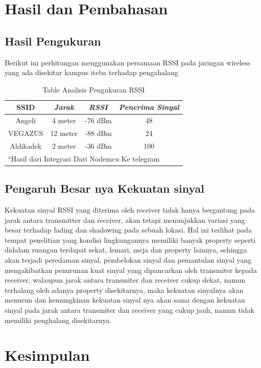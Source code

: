 \documentclass[conference]{IEEEtran}
\begin{document}
\section{Hasil dan Pembahasan}
\subsection{Hasil Pengukuran}
Berikut ini perhitungan menggunakan persamaan RSSI 
pada jaringan wireless yang ada disekitar 
kampus iteba terhadap pengahalang



\begin{table}[htbp]
    \caption{Table Analisis Pengukuran RSSI}
    \begin{center}
    \begin{tabular}{|c|c|c|c|}
        \hline
    \textbf{SSID} & \textbf{\textit{Jarak}}& \textbf{\textit{RSSI}}& \textbf{\textit{Penerima Sinyal}} \\
    \hline
    Angeli & 4 meter& -76 dBm & 48  \\
    \hline
    VEGAZUS & 12 meter& -88 dBm & 24  \\
    \hline
    Aldikadek & 2 meter& -36 dBm & 100   \\
    \hline
    \multicolumn{4}{l}{$^{\mathrm{a}}$Hasil dari Integrasi Dari Nodemcu Ke telegram}
    \end{tabular}
    \label{tab1}
    \end{center}
    \end{table}

\subsection{Pengaruh Besar nya Kekuatan sinyal}
Kekuatan sinyal RSSI yang diterima oleh
receiver tidak hanya bergantung pada jarak
antara transmitter dan receiver, akan tetapi
menunjukkan variasi yang besar terhadap fading
dan shadowing pada sebuah lokasi. Hal ini
terlihat pada tempat penelitian yang kondisi
lingkungannya memiliki banyak property seperti
didalam ruangan terdapat sekat, lemari, meja dan
property lainnya, sehingga akan terjadi peredaman sinyal, pembelokan sinyal dan pemantulan
sinyal yang mengakibatkan penurunan kuat
sinyal yang dipancarkan oleh transmiter kepada
receiver, walaupun jarak antara transmiter dan
receiver cukup dekat, namun terhalang oleh
adanya property disekitarnya, maka kekuatan
sinyalnya akan menurun dan kemungkinan
kekuatan sinyal nya akan sama dengan kekuatan
sinyal pada jarak antara transmiter dan receiver
yang cukup jauh, namun tidak memiliki
penghalang disekitarnya.

\section{Kesimpulan}



\end{document}
